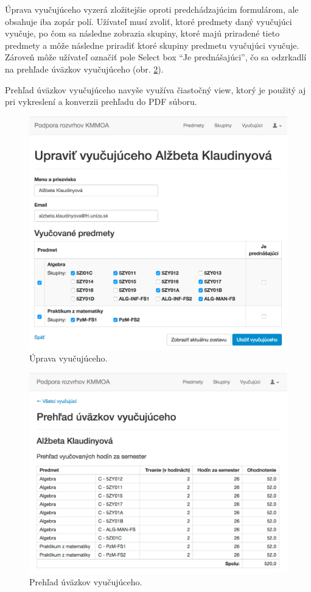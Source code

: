 Úprava vyučujúceho vyzerá zložitejšie oproti predchádzajúcim formulárom, ale obsahuje iba zopár polí. Užívateľ musí zvoliť, ktoré predmety daný vyučujúci vyučuje, po čom sa následne zobrazia skupiny, ktoré majú priradené tieto predmety a môže následne priradiť ktoré skupiny predmetu vyučujúci vyučuje. Zároveň môže užívateľ označiť pole Select box ``Je prednášajúci'', čo sa odzrkadlí na prehľade úväzkov vyučujúceho (obr. \ref{fig:teacher_show}).

Prehľad úväzkov vyučujúceho navyše využíva čiastočný view, ktorý je použitý aj pri vykreslení a konverzii prehľadu do PDF súboru.

\begin{figure}[!htb]
  \centering
  \includegraphics[width=1\textwidth]{content/images/ui/teacher_edit}
  \caption{Úprava vyučujúceho.}
  \label{fig:teacher_edit}
\end{figure}

\begin{figure}[!htb]
  \centering
  \includegraphics[width=1\textwidth]{content/images/ui/teacher_show}
  \caption{Prehľad úväzkov vyučujúceho.}
  \label{fig:teacher_show}
\end{figure}


